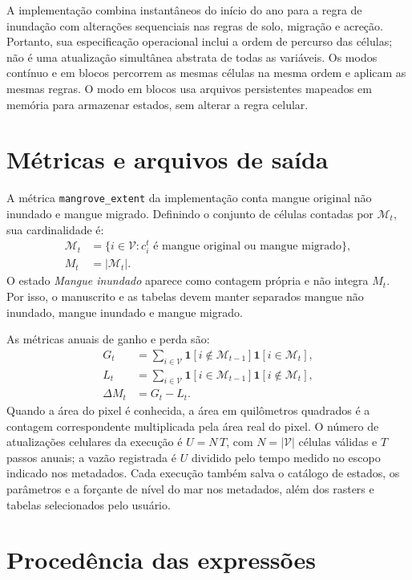\documentclass[11pt,a4paper]{article}
\begin{document}
A implementação combina instantâneos do início do ano para a regra de inundação com alterações sequenciais nas regras de solo, migração e acreção. Portanto, sua especificação operacional inclui a ordem de percurso das células; não é uma atualização simultânea abstrata de todas as variáveis. Os modos contínuo e em blocos percorrem as mesmas células na mesma ordem e aplicam as mesmas regras. O modo em blocos usa arquivos persistentes mapeados em memória para armazenar estados, sem alterar a regra celular.

\section{Métricas e arquivos de saída}

A métrica \texttt{mangrove\_extent} da implementação conta mangue original não inundado e mangue migrado. Definindo o conjunto de células contadas por $\mathcal{M}_t$, sua cardinalidade é:
\begin{align}
\mathcal{M}_t&=\{i\in\mathcal{V}: c_i^t
\text{ é mangue original ou mangue migrado}\},\\
M_t&=|\mathcal{M}_t|.
\label{eq:extent}
\end{align}
O estado \textit{Mangue inundado} aparece como contagem própria e não integra $M_t$. Por isso, o manuscrito e as tabelas devem manter separados mangue não inundado, mangue inundado e mangue migrado.

As métricas anuais de ganho e perda são:
\begin{align}
G_t &= \sum_{i\in\mathcal{V}}
\mathbf{1}[i\notin\mathcal{M}_{t-1}]\mathbf{1}[i\in\mathcal{M}_t],\\
L_t &= \sum_{i\in\mathcal{V}}
\mathbf{1}[i\in\mathcal{M}_{t-1}]\mathbf{1}[i\notin\mathcal{M}_t],\\
\Delta M_t &= G_t-L_t.
\end{align}
Quando a área do pixel é conhecida, a área em quilômetros quadrados é a contagem correspondente multiplicada pela área real do pixel. O número de atualizações celulares da execução é $U=N\,T$, com $N=|\mathcal{V}|$ células válidas e $T$ passos anuais; a vazão registrada é $U$ dividido pelo tempo medido no escopo indicado nos metadados. Cada execução também salva o catálogo de estados, os parâmetros e a forçante de nível do mar nos metadados, além dos rasters e tabelas selecionados pelo usuário.

\section{Procedência das expressões}
\end{document}
